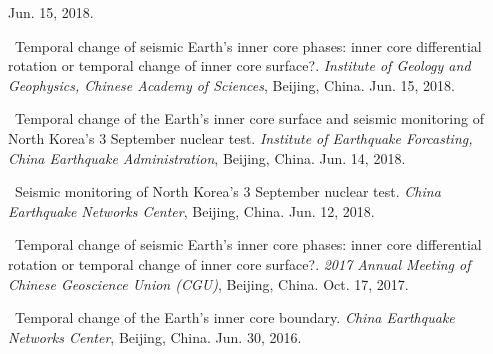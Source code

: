 \begin{etaremune}
    Jun. 15, 2018.
    \invited
\item
    \Yao\
    Temporal change of seismic Earth’s inner core phases: inner core differential rotation or temporal change of inner core surface?.
    \textit{Institute of Geology and Geophysics, Chinese Academy of Sciences}, Beijing, China.
    Jun. 15, 2018.
    \invited
\item
    \Yao\
    Temporal change of the Earth’s inner core surface and seismic monitoring of North Korea’s 3 September nuclear test.
    \textit{Institute of Earthquake Forcasting, China Earthquake Administration}, Beijing, China.
    Jun. 14, 2018.
\item
    \Yao\
    Seismic monitoring of North Korea’s 3 September nuclear test.
    \textit{China Earthquake Networks Center}, Beijing, China.
    Jun. 12, 2018.
\item
    \Yao\
    Temporal change of seismic Earth’s inner core phases: inner core differential rotation or temporal change of inner core surface?.
    \textit{2017 Annual Meeting of Chinese Geoscience Union (CGU)}, Beijing, China.
    Oct. 17, 2017.
    \invited
\item
    \Yao\
    Temporal change of the Earth’s inner core boundary.
    \textit{China Earthquake Networks Center}, Beijing, China.
    Jun. 30, 2016.
    \invited
\end{etaremune}
